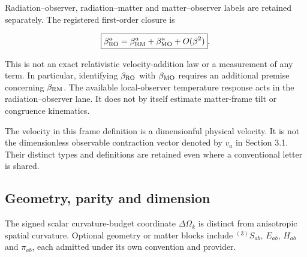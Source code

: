 \documentclass[
  11pt,
  a4paper]{article}
\begin{document}
Radiation--observer, radiation--matter and matter--observer labels are retained separately. The registered first-order closure is

\[
\boxed{\beta_{\rm RO}^a
=\beta_{\rm RM}^a+\beta_{\rm MO}^a+O(\beta^2)}.
\]

This is not an exact relativistic velocity-addition law or a measurement of any term. In particular, identifying \(\beta_{\rm RO}\) with \(\beta_{\rm MO}\) requires an additional premise concerning \(\beta_{\rm RM}\). The available local-observer temperature response acts in the radiation--observer lane. It does not by itself estimate matter-frame tilt or congruence kinematics.

The velocity in this frame definition is a dimensionful physical velocity. It is not the dimensionless observable contraction vector denoted by \(v_a\) in Section 3.1. Their distinct types and definitions are retained even where a conventional letter is shared.

\hypertarget{geometry-parity-and-dimension}{%
\subsection{Geometry, parity and dimension}\label{geometry-parity-and-dimension}}

The signed scalar curvature-budget coordinate \(\Delta\Omega_k\) is distinct from anisotropic spatial curvature. Optional geometry or matter blocks include \({}^{(3)}S_{ab}\), \(E_{ab}\), \(H_{ab}\) and \(\pi_{ab}\), each admitted under its own convention and provider.
\end{document}
